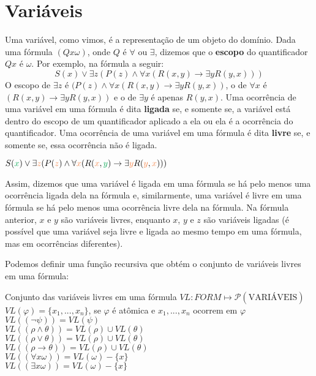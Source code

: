 \section{Variáveis}

Uma variável, como vimos, é a representação de um objeto do domínio. Dada uma fórmula $(Q x\omega)$, onde $Q$ é $\forall$ ou $\exists$, dizemos que o \textbf{escopo} do quantificador $Q x$ é $\omega$. Por exemplo, na fórmula a seguir:
\[S(x) \lor \exists z(P(z) \land \forall x(R(x,y) \rightarrow \exists yR(y,x)))\]
O escopo de $\exists z$ é $(P(z) \land \forall x(R(x,y) \rightarrow \exists yR(y,x))$, o de $\forall x$ é $(R(x,y) \rightarrow \exists yR(y,x))$ e o de $\exists y$ é apenas $R(y,x)$. 
Uma ocorrência de uma variável em uma fórmula é dita \textbf{ligada} se, e somente se, a variável está dentro do escopo de um quantificador aplicado a ela ou ela é a ocorrência do quantificador. Uma ocorrência de uma variável em uma fórmula é dita \textbf{livre} se, e somente se, essa ocorrência não é ligada. 
\begin{center}
    $S({\color{Green}x}) \lor \exists {\color{Peach}z}(P({\color{Peach}z}) \land \forall {\color{Peach}x}(R({\color{Peach}x},{\color{Green}y}) \rightarrow \exists {\color{Peach}y}R({\color{Peach}y},{\color{Peach}x})))$
\end{center}

Assim, dizemos que uma variável é ligada em uma fórmula se há pelo menos uma ocorrência ligada dela na fórmula e, similarmente, uma variável é livre em uma fórmula se há pelo menos uma ocorrência livre dela na fórmula. Na fórmula anterior, $x$ e $y$ são variáveis {\color{Green}livres}, enquanto $x$, $y$ e $z$ são variáveis {\color{Peach}ligadas} (é possível que uma variável seja livre e ligada ao mesmo tempo em uma fórmula, mas em ocorrências diferentes).

Podemos definir uma função recursiva que obtém o conjunto de variáveis livres em uma fórmula:
\begin{definition}{Conjunto das variáveis livres em uma fórmula}
    $VL: FORM \mapsto \mathcal{P}(\text{VARIÁVEIS})$ \\
    $VL(\varphi) = \{x_1,...,x_n\}$, se $\varphi$ é atômica e $x_1,...,x_n$ ocorrem em $\varphi$ \\
    $VL((\neg \psi)) = VL(\psi)$ \\
    $VL((\rho \land \theta)) = VL(\rho) \cup VL(\theta)$ \\
    $VL((\rho \lor \theta)) = VL(\rho) \cup VL(\theta)$ \\
    $VL((\rho \rightarrow \theta)) = VL(\rho) \cup VL(\theta)$ \\
    $VL((\forall x\omega)) = VL(\omega) - \{x\}$ \\
    $VL((\exists x\omega)) = VL(\omega) - \{x\}$
\end{definition}

